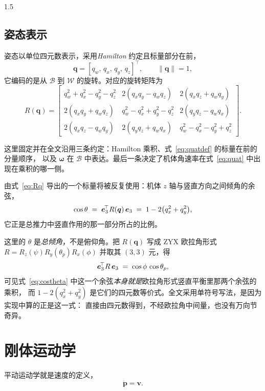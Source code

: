 \begin{spacing}{1.5}
\subsection{姿态表示}\label{sec:model:quat}

姿态以单位四元数表示，采用\emph{Hamilton} 约定且标量部分在前，
\begin{equation}
\bm{q} = [q_w,\, q_x,\, q_y,\, q_z]^{\!\top},
\qquad \|\bm{q}\| = 1,
\label{eq:quatdef}
\end{equation}
它编码的是从 $\mathcal{B}$ 到 $\mathcal{W}$ 的旋转。对应的旋转矩阵为
\begin{equation}
R(\bm{q}) =
\begin{bmatrix}
q_w^2 + q_x^2 - q_y^2 - q_z^2 & 2(q_xq_y - q_wq_z) & 2(q_xq_z + q_wq_y) \\[2pt]
2(q_xq_y + q_wq_z) & q_w^2 - q_x^2 + q_y^2 - q_z^2 & 2(q_yq_z - q_wq_x) \\[2pt]
2(q_xq_z - q_wq_y) & 2(q_yq_z + q_wq_x) & q_w^2 - q_x^2 - q_y^2 + q_z^2
\end{bmatrix}.
\label{eq:Rq}
\end{equation}

这里固定并在全文沿用三条约定：Hamilton 乘积、式~\eqref{eq:quatdef} 的标量在前的分量顺序，
以及 $\bm{\omega}$ 在 $\mathcal{B}$ 中表达。最后一条决定了机体角速率在式~\eqref{eq:quat}
中出现在乘积的哪一侧。

由式~\eqref{eq:Rq} 导出的一个标量将被反复使用：机体 $z$ 轴与竖直方向之间倾角的余弦，
\begin{equation}
\cos\theta \;=\; \bm{e}_3^{\!\top} R(\bm{q})\, \bm{e}_3 \;=\; 1 - 2\bigl(q_x^2+q_y^2\bigr),
\label{eq:costheta}
\end{equation}
它正是总推力中竖直作用的那一部分所占的比例。

这里的 $\theta$ 是\emph{总倾角}，不是俯仰角。把 $R(\bm{q})$ 写成 ZYX 欧拉角形式
$R = R_z(\psi)R_y(\theta_p)R_x(\phi)$ 并取其 $(3,3)$ 元，得
\[
\bm{e}_3^{\!\top} R\, \bm{e}_3 \;=\; \cos\phi\,\cos\theta_p ,
\]
可见式~\eqref{eq:costheta} 中这一个余弦\emph{本身就是}欧拉角形式竖直平衡里那两个余弦的乘积，
而 $1-2(q_x^2+q_y^2)$ 是它们的四元数等价式。全文采用单符号写法，是因为实现中算的正是这一式：
直接由四元数得到，不经欧拉角中间量，也没有万向节奇异。

\section{刚体运动学}\label{sec:model:kin}

平动运动学就是速度的定义，
\begin{equation}
\dot{\bm{p}} = \bm{v}.
\label{eq:kin}
\end{equation}


\end{spacing}
